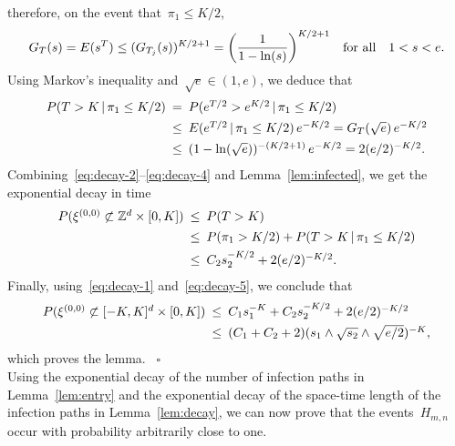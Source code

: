 \documentclass[letterpaper,11pt,twoside,keywordsasfootnote,addressatend,noinfoline]{article}
\newenvironment{proof}{\noindent{\bf Proof.}}{\hspace*{2mm}~$\square$}
\newcommand{\Z}{\mathbb{Z}}
\newcommand{\n}{\hspace*{-5pt}}
\begin{document}
\begin{proof}
 therefore, on the event that~$\pi_1 \leq K/2$,
 $$ G_T (s) = E (s^T) \leq (G_{T_j} (s))^{K/2 + 1} = \bigg(\frac{1}{1 - \ln (s)} \bigg)^{K/2 + 1} \quad \hbox{for all} \quad 1 < s < e. $$
 Using Markov's inequality and~$\sqrt{e} \in (1, e)$, we deduce that
\begin{equation}
\label{eq:decay-4}
\begin{array}{rcl}
  P (T > K \,| \,\pi_1 \leq K/2) & \n = \n &
  P (e^{T/2} > e^{K/2} \,| \,\pi_1 \leq K/2) \vspace*{4pt} \\ & \n \leq \n &
  E (e^{T/2} \,| \,\pi_1 \leq K/2) \,e^{-K/2} = G_T (\sqrt{e}) \,e^{-K/2} \vspace*{4pt} \\ & \n \leq \n &
  (1 - \ln (\sqrt{e}))^{- (K/2 + 1)} \,e^{-K/2} = 2 (e/2)^{-K/2}. \end{array}
\end{equation}
 Combining~\eqref{eq:decay-2}--\eqref{eq:decay-4} and Lemma~\ref{lem:infected}, we get the exponential decay in time
\begin{equation}
\label{eq:decay-5}
\begin{array}{rcl}
  P (\xi^{(0, 0)} \not \subset \Z^d \times [0, K]) & \n \leq \n &
  P (T > K) \vspace*{4pt} \\ & \n \leq \n &
  P (\pi_1 > K/2) + P (T > K \,| \,\pi_1 \leq K/2) \vspace*{4pt} \\ & \n \leq \n &
  C_2 s_2^{-K/2} + 2 (e/2)^{-K/2}. \end{array}
\end{equation}
 Finally, using~\eqref{eq:decay-1} and~\eqref{eq:decay-5}, we conclude that
 $$ \begin{array}{rcl}
      P (\xi^{(0, 0)} \not \subset [-K, K]^d \times [0, K]) & \n \leq \n &
      C_1 s_1^{-K} + C_2 s_2^{-K/2} + 2 (e/2)^{-K/2} \vspace*{4pt} \\ & \n \leq \n &
     (C_1 + C_2 + 2)(s_1 \wedge \sqrt{s_2} \wedge \sqrt{e/2})^{-K}, \end{array} $$
 which proves the lemma.
\end{proof} \vspace*{8pt} \\
 Using the exponential decay of the number of infection paths in Lemma~\ref{lem:entry} and the exponential decay of the space-time length of the infection paths in Lemma~\ref{lem:decay}, we can now prove that the events~$H_{m, n}$ occur with probability arbitrarily close to one.
\end{document}
